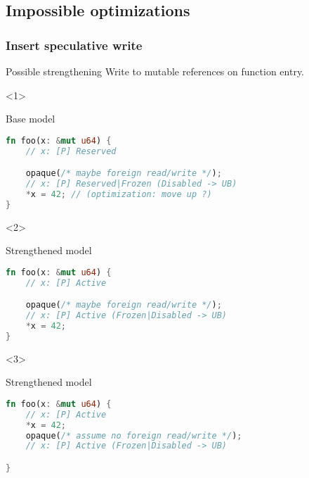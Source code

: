 \subsection{Impossible optimizations}

\begin{frame}[fragile, t]
    \frametitle{Insert speculative write}

    \begin{exampleblock}{Possible strengthening}
        Write to mutable references on function entry.
    \end{exampleblock}

    \begin{onlyenv}<1>
        \begin{block}{{\xmark} Base model}
            \begin{lstlisting}[language=rust, basicstyle=\ttfamily\scriptsize]
fn foo(x: &mut u64) {
    // x: [P] Reserved

    opaque(/* maybe foreign read/write */);
    // x: [P] Reserved|Frozen (Disabled -> UB)
    *x = 42; // (optimization: move up ?)
}
            \end{lstlisting}
        \end{block}
    \end{onlyenv}

    \begin{onlyenv}<2>
        \begin{block}{{\cmark} Strengthened model}
            \begin{lstlisting}[language=rust, basicstyle=\ttfamily\scriptsize]
fn foo(x: &mut u64) {
    // x: [P] Active

    opaque(/* maybe foreign read/write */);
    // x: [P] Active (Frozen|Disabled -> UB)
    *x = 42;
}
            \end{lstlisting}
        \end{block}
    \end{onlyenv}

    \begin{onlyenv}<3>
        \begin{block}{{\cmark} Strengthened model}
            \begin{lstlisting}[language=rust, basicstyle=\ttfamily\scriptsize]
fn foo(x: &mut u64) {
    // x: [P] Active
    *x = 42;
    opaque(/* assume no foreign read/write */);
    // x: [P] Active (Frozen|Disabled -> UB)

}
            \end{lstlisting}
        \end{block}
    \end{onlyenv}


\end{frame}
